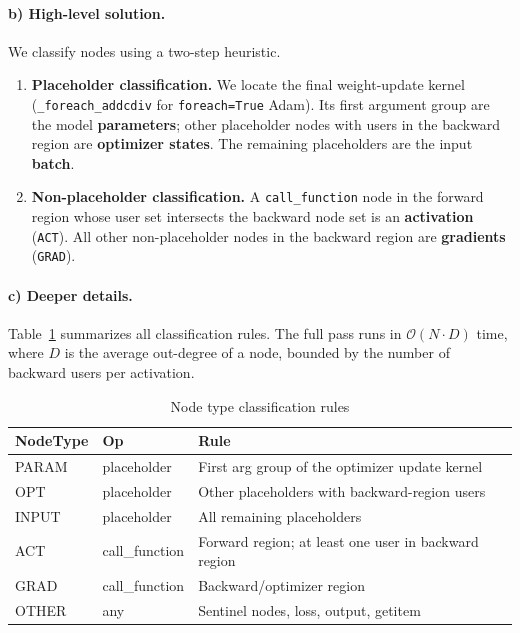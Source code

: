 \documentclass[11pt]{article}
\begin{document}
\paragraph{b) High-level solution.}
We classify nodes using a two-step heuristic.
\begin{enumerate}
  \item \textbf{Placeholder classification.}
    We locate the final weight-update kernel (\texttt{\_foreach\_addcdiv}
    for \texttt{foreach=True} Adam).
    Its first argument group are the model \textbf{parameters}; other
    placeholder nodes with users in the backward region are
    \textbf{optimizer states}.
    The remaining placeholders are the input \textbf{batch}.
  \item \textbf{Non-placeholder classification.}
    A \texttt{call\_function} node in the forward region whose user set
    intersects the backward node set is an \textbf{activation}
    (\texttt{ACT}).
    All other non-placeholder nodes in the backward region are
    \textbf{gradients} (\texttt{GRAD}).
\end{enumerate}

\paragraph{c) Deeper details.}
Table~\ref{tab:nodetypes} summarizes all classification rules.
The full pass runs in $\mathcal{O}(N \cdot D)$ time, where $D$ is the
average out-degree of a node, bounded by the number of backward users
per activation.

\begin{table}[h]
\centering
\caption{Node type classification rules}
\label{tab:nodetypes}
\begin{tabular}{lll}
\toprule
\textbf{NodeType} & \textbf{Op} & \textbf{Rule} \\
\midrule
PARAM  & placeholder     & First arg group of the optimizer update kernel \\
OPT    & placeholder     & Other placeholders with backward-region users \\
INPUT  & placeholder     & All remaining placeholders \\
ACT    & call\_function  & Forward region; at least one user in backward region \\
GRAD   & call\_function  & Backward/optimizer region \\
OTHER  & any             & Sentinel nodes, loss, output, getitem \\
\bottomrule
\end{tabular}
\end{table}
\end{document}
